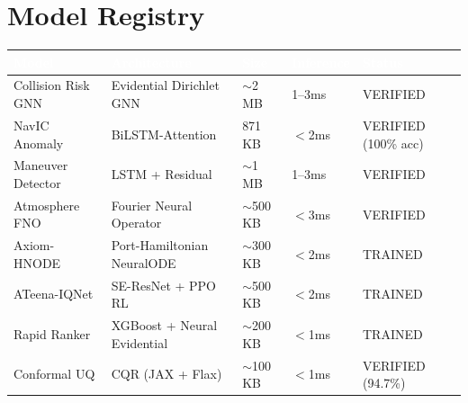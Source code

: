 \documentclass[11pt,a4paper]{article}
\newcommand{\TH}[1]{\textcolor{white}{\textbf{#1}}}
\begin{document}
\section{Model Registry}
\begin{table}[H]\centering\small
\begin{tabularx}{\textwidth}{|p{3.5cm}|p{4cm}|p{1.6cm}|p{1.8cm}|X|}
\hline
\rowcolor{dblue}\TH{Model} & \TH{Architecture} & \TH{Size} & \TH{Inference} & \TH{Status} \\
\hline
Collision Risk GNN & Evidential Dirichlet GNN & $\sim$2 MB & 1--3ms & \textcolor{dgreen}{VERIFIED} \\
\hline
NavIC Anomaly & BiLSTM-Attention & 871 KB & $<$2ms & \textcolor{dgreen}{VERIFIED (100\% acc)} \\
\hline
Maneuver Detector & LSTM + Residual & $\sim$1 MB & 1--3ms & \textcolor{dgreen}{VERIFIED} \\
\hline
Atmosphere FNO & Fourier Neural Operator & $\sim$500 KB & $<$3ms & \textcolor{dgreen}{VERIFIED} \\
\hline
Axiom-HNODE & Port-Hamiltonian NeuralODE & $\sim$300 KB & $<$2ms & \textcolor{dgreen}{TRAINED} \\
\hline
ATeena-IQNet & SE-ResNet + PPO RL & $\sim$500 KB & $<$2ms & \textcolor{dgreen}{TRAINED} \\
\hline
Rapid Ranker & XGBoost + Neural Evidential & $\sim$200 KB & $<$1ms & \textcolor{dgreen}{TRAINED} \\
\hline
Conformal UQ & CQR (JAX + Flax) & $\sim$100 KB & $<$1ms & \textcolor{dgreen}{VERIFIED (94.7\%)} \\
\hline
\end{tabularx}
\end{table}
\end{document}
